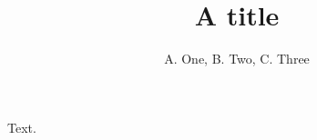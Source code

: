 \documentclass{article}
\title{A title}
\author{A. One\refaddr{la}, B. Two\refaddr{lb}, C. Three\refaddr{la,lb}}
\begin{document}
\maketitle
Text.
\end{document}
